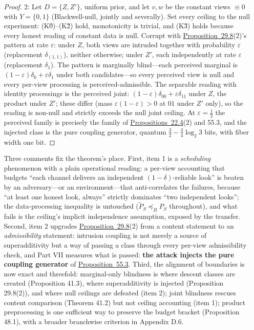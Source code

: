 \begin{proof}
2: Let \(D = \{Z, Z'\}\), uniform prior, and let \(v, w\) be the constant views \(\equiv 0\) with \(Y = \{0,1\}\) (Blackwell-null, jointly and severally). Set every ceiling to the null experiment: (K0̂)--(K2̂) hold, monotonicity is trivial, and (K3̂) holds because every honest reading of constant data is null. Corrupt with \hyperlink{stmt:29.8}{Proposition~29.8}(2)'s pattern at rate \(\varepsilon\): under \(Z\), both views are intruded together with probability \(\varepsilon\) (replacement \(\delta_{(1,1)}\)), neither otherwise; under \(Z'\), each independently at rate \(\varepsilon\) (replacement \(\delta_1\)). The pattern is marginally blind---\hspace{0pt}each perceived marginal is \((1-\varepsilon)\delta_0 + \varepsilon\delta_1\) under both candidates---\hspace{0pt}so every perceived view is null and every per-view processing is perceived-admissible. The separable reading with identity processings is the perceived joint: \((1-\varepsilon)\delta_{00} + \varepsilon\delta_{11}\) under \(Z\), the product under \(Z'\); these differ (mass \(\varepsilon(1-\varepsilon) > 0\) at \(01\) under \(Z'\) only), so the reading is non-null and strictly exceeds the null joint ceiling. At \(\varepsilon = \tfrac12\) the perceived family is precisely the family of \hyperlink{stmt:22.4}{Propositions~22.4}(2) and 55.3, and the injected class is the pure coupling generator, quantum \(\tfrac32 - \tfrac34\log_2 3\) bits, with fiber width one bit.
\end{proof}

Three comments fix the theorem's place. First, item 1 is a \emph{scheduling} phenomenon with a plain operational reading: a per-view accounting that budgets ``each channel delivers an independent \((1-\delta)\)-reliable look'' is beaten by an adversary---\hspace{0pt}or an environment---\hspace{0pt}that anti-correlates the failures, because ``at least one honest look, always'' strictly dominates ``two independent looks''; the data-processing inequality is untouched (\(\widetilde{P}_S \preceq_B P_S\) throughout), and what fails is the ceiling's implicit independence assumption, exposed by the transfer. Second, item 2 upgrades \hyperlink{stmt:29.8}{Proposition~29.8}(2) from a content statement to an \emph{admissibility} statement: intrusion coupling is not merely a source of superadditivity but a way of passing a class through every per-view admissibility check, and Part VII measures what is passed: \textbf{the attack injects the pure coupling generator} of \hyperlink{stmt:55.3}{Proposition~55.3}. Third, the alignment of boundaries is now exact and threefold: marginal-only blindness is where descent classes are created (Proposition 41.3), where superadditivity is injected (Proposition 29.8(2)), and where null ceilings are defeated (item 2); joint blindness rescues content comparison (Theorem 41.2) but not ceiling accounting (item 1); product preprocessing is one sufficient way to preserve the budget bracket (Proposition 48.1), with a broader branchwise criterion in Appendix D.6.

